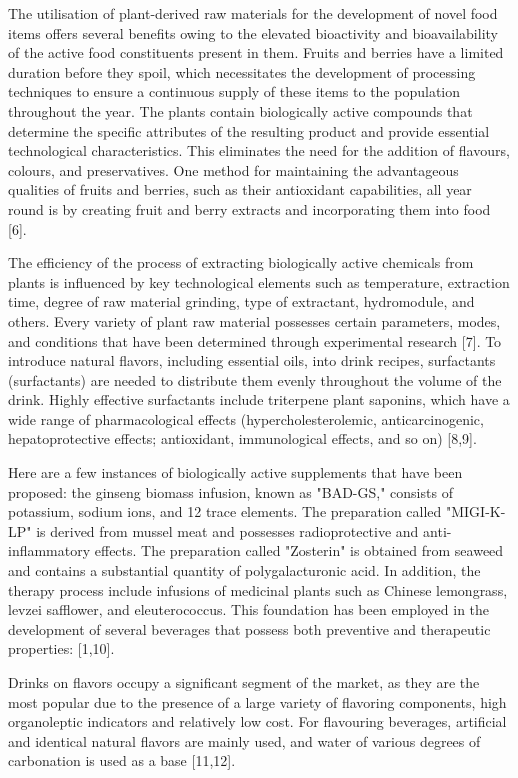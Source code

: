 The utilisation of plant-derived raw materials for the development of
novel food items offers several benefits owing to the elevated
bioactivity and bioavailability of the active food constituents present
in them. Fruits and berries have a limited duration before they spoil,
which necessitates the development of processing techniques to ensure a
continuous supply of these items to the population throughout the year.
The plants contain biologically active compounds that determine the
specific attributes of the resulting product and provide essential
technological characteristics. This eliminates the need for the addition
of flavours, colours, and preservatives. One method for maintaining the
advantageous qualities of fruits and berries, such as their antioxidant
capabilities, all year round is by creating fruit and berry extracts and
incorporating them into food {[}6{]}.~

The efficiency of the process of extracting biologically active
chemicals from plants is influenced by key technological elements such
as temperature, extraction time, degree of raw material grinding, type
of extractant, hydromodule, and others. Every variety of plant raw
material possesses certain parameters, modes, and conditions that have
been determined through experimental research {[}7{]}. To introduce
natural flavors, including essential oils, into drink recipes,
surfactants (surfactants) are needed to distribute them evenly
throughout the volume of the drink. Highly effective surfactants include
triterpene plant saponins, which have a wide range of pharmacological
effects (hypercholesterolemic, anticarcinogenic, hepatoprotective
effects; antioxidant, immunological effects, and so on) {[}8,9{]}.

Here are a few instances of biologically active supplements that have
been proposed: the ginseng biomass infusion, known as "BAD-GS," consists
of potassium, sodium ions, and 12 trace elements. The preparation called
"MIGI-K-LP" is derived from mussel meat and possesses radioprotective
and anti-inflammatory effects. The preparation called "Zosterin" is
obtained from seaweed and contains a substantial quantity of
polygalacturonic acid. In addition, the therapy process include
infusions of medicinal plants such as Chinese lemongrass, levzei
safflower, and eleuterococcus. This foundation has been employed in the
development of several beverages that possess both preventive and
therapeutic properties: {[}1,10{]}.

Drinks on flavors occupy a significant segment of the market, as they
are the most popular due to the presence of a large variety of flavoring
components, high organoleptic indicators and relatively low cost. For
flavouring beverages, artificial and identical natural flavors are
mainly used, and water of various degrees of carbonation is used as a
base {[}11,12{]}.

